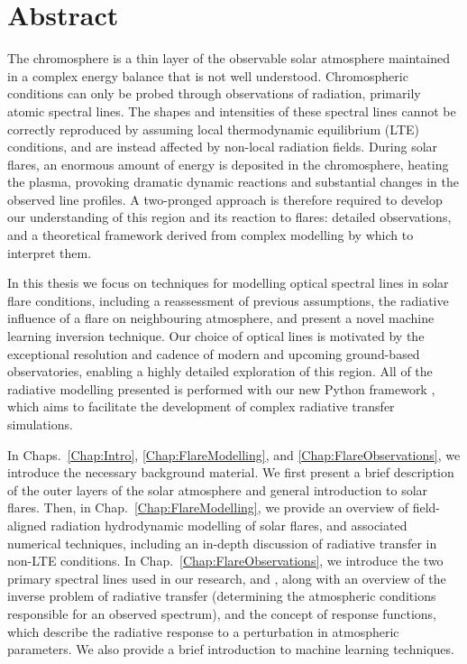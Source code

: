 \chapter{Abstract}

The chromosphere is a thin layer of the observable solar atmosphere maintained in a complex energy balance that is not well understood.
Chromospheric conditions can only be probed through observations of radiation, primarily atomic spectral lines.
The shapes and intensities of these spectral lines cannot be correctly reproduced by assuming local thermodynamic equilibrium (LTE) conditions, and are instead affected by non-local radiation fields.
During solar flares, an enormous amount of energy is deposited in the chromosphere, heating the plasma, provoking dramatic dynamic reactions and substantial changes in the observed line profiles.
A two-pronged approach is therefore required to develop our understanding of this region and its reaction to flares: detailed observations, and a theoretical framework derived from complex modelling by which to interpret them.

In this thesis we focus on techniques for modelling optical spectral lines in solar flare conditions, including a reassessment of previous assumptions, the radiative influence of a flare on neighbouring atmosphere, and present a novel machine learning inversion technique.
Our choice of optical lines is motivated by the exceptional resolution and cadence of modern and upcoming ground-based observatories, enabling a highly detailed exploration of this region.
All of the radiative modelling presented is performed with our new Python framework \Lw{}, which aims to facilitate the development of complex radiative transfer simulations.

In Chaps.~\ref{Chap:Intro}, \ref{Chap:FlareModelling}, and \ref{Chap:FlareObservations}, we introduce the necessary background material.
We first present a brief description of the outer layers of the solar atmosphere and general introduction to solar flares.
Then, in Chap.~\ref{Chap:FlareModelling}, we provide an overview of field-aligned radiation hydrodynamic modelling of solar flares, and associated numerical techniques, including an in-depth discussion of radiative transfer in non-LTE conditions.
In Chap.~\ref{Chap:FlareObservations}, we introduce the two primary spectral lines used in our research, \Ha{} and \CaLine{}, along with an overview of the inverse problem of radiative transfer (determining the atmospheric conditions responsible for an observed spectrum), and the concept of response functions, which describe the radiative response to a perturbation in atmospheric parameters.
We also provide a brief introduction to machine learning techniques.

